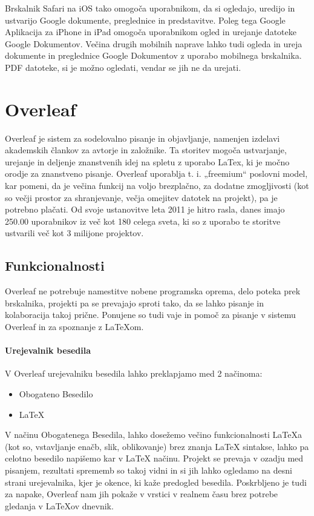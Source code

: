 \documentclass[a4paper, 12pt]{book}
\begin{document}
Brskalnik Safari na iOS tako omogoča uporabnikom, da si ogledajo, uredijo in ustvarijo Google dokumente, preglednice in predstavitve. \cite{81} Poleg tega Google Aplikacija za iPhone in iPad  omogoča uporabnikom ogled in urejanje datoteke Google Dokumentov. Večina drugih mobilnih naprave lahko tudi ogleda in ureja dokumente in preglednice Google Dokumentov  z uporabo mobilnega brskalnika. \cite{82} PDF datoteke, si je možno ogledati, vendar se jih ne da urejati. 

\section{Overleaf}
\label{overleaf}

Overleaf je sistem za sodelovalno pisanje in objavljanje, namenjen izdelavi akademskih člankov za avtorje in založnike. Ta storitev mogoča ustvarjanje, urejanje in deljenje znanstvenih idej na spletu z uporabo LaTex, ki je močno orodje za znanstveno pisanje. Overleaf uporablja t. i. „freemium“ poslovni model, kar pomeni, da je večina funkcij na voljo brezplačno, za dodatne zmogljivosti (kot so večji prostor za shranjevanje, večja omejitev datotek na projekt), pa je potrebno plačati. Od svoje ustanovitve leta 2011 je hitro rasla, danes imajo 250.00 uporabnikov iz več kot 180 celega sveta, ki so z uporabo te storitve ustvarili več kot 3 milijone projektov.

\subsection{Funkcionalnosti}
Overleaf ne potrebuje namestitve nobene programska oprema, delo poteka prek brskalnika, projekti pa se prevajajo sproti tako, da se lahko pisanje in kolaboracija takoj prične. Ponujene so tudi vaje in pomoč za pisanje v sistemu Overleaf in za spoznanje z LaTeXom.

\paragraph{Urejevalnik besedila}
V Overleaf urejevalniku besedila lahko preklapjamo med 2 načinoma:
\begin{itemize}
	\item Obogateno Besedilo
	\item LaTeX
\end{itemize}
V načinu Obogatenega Besedila, lahko dosežemo večino funkcionalnosti LaTeXa (kot so, vstavljanje enačb, slik, oblikovanje) brez znanja LaTeX sintakse, lahko pa celotno besedilo napišemo kar v LaTeX načinu. Projekt se prevaja v ozadju med pisanjem, rezultati sprememb so takoj vidni in si jih lahko ogledamo na desni strani urejevalnika, kjer je okence, ki kaže predogled besedila. Poskrbljeno je tudi za napake, Overleaf nam jih pokaže v vrstici v realnem času brez potrebe gledanja v LaTeXov dnevnik.
\end{document}
